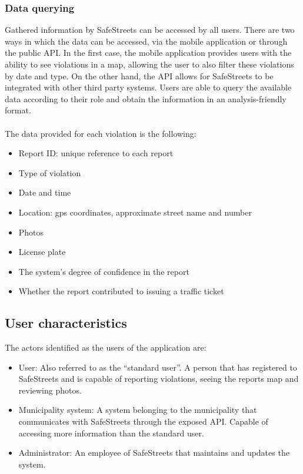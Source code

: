\subsubsection{Data querying}
Gathered information by SafeStreets can be accessed by all users. There are two ways in which the data can be accessed, via the mobile application or through the public API.
In the first case, the mobile application provides users with the ability to see violations in a map, allowing the user to also filter these violations by date and type. 
On the other hand, the API allows for SafeStreets to be integrated with other third party systems. Users are able to query the available data according to their role and obtain the information in an analysis-friendly format.\\\\
The data provided for each violation is the following:
\begin{itemize}
\item
Report ID: unique reference to each report
\item
Type of violation
\item
Date and time
\item
Location: gps coordinates, approximate street name and number
\item
Photos
\item
License plate
\item
The system’s degree of confidence in the report
\item
Whether the report contributed to issuing a traffic ticket
\end{itemize}


\subsection{User characteristics}
The actors identified as the users of the application are:
\begin{itemize}
\item
User: Also referred to as the “standard user”. A person that has registered to SafeStreets and is capable of reporting violations, seeing the reports map and reviewing photos. 
\item
Municipality system: A system belonging to the municipality that communicates with SafeStreets through the exposed API. Capable of accessing more information than the standard user.
\item
Administrator: An employee of SafeStreets that maintains and updates the system.
\end{itemize}


